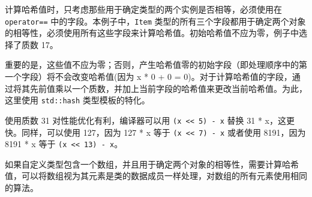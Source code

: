 计算哈希值时，只考虑那些用于确定类型的两个实例是否相等，必须使用在 \verb|operator==| 中的字段。本例子中，\verb|Item| 类型的所有三个字段都用于确定两个对象的相等性，必须使用所有这些字段来计算哈希值。初始哈希值不应为零，例子中选择了质数 17。

重要的是，这些值不应为零；否则，产生哈希值零的初始字段（即处理顺序中的第一个字段）将不会改变哈希值(因为 x * 0 + 0 = 0)。对于计算哈希值的字段，通过将其先前值乘以一个质数，并加上当前字段的哈希值来更改当前哈希值。为此，这里使用 \verb|std::hash| 类型模板的特化。

使用质数 31 对性能优化有利，编译器可以用 \verb|(x << 5) - x| 替换 31 * x，这更快。同样，可以使用 127，因为 127 * x 等于 \verb|(x << 7) - x| 或者使用 8191，因为 8191 * x 等于 \verb|(x << 13) - x|。

如果自定义类型包含一个数组，并且用于确定两个对象的相等性，需要计算哈希值，可以将数组视为其元素是类的数据成员一样处理，对数组的所有元素使用相同的算法。

